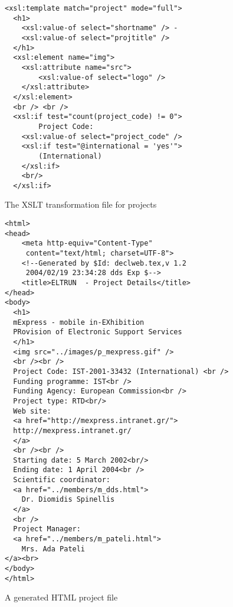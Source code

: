 \documentclass[10pt]{article}
\begin{document}
\begin{figure}
\lstset{language=PROJECTXSLT}
{\begin{lstlisting}
<xsl:template match="project" mode="full">
  <h1> 
  	<xsl:value-of select="shortname" /> -
	<xsl:value-of select="projtitle" /> 
  </h1>
  <xsl:element name="img">
  	<xsl:attribute name="src">
		<xsl:value-of select="logo" />
	</xsl:attribute>
  </xsl:element>
  <br /> <br />
  <xsl:if test="count(project_code) != 0">
    	Project Code: 
	<xsl:value-of select="project_code" />
	<xsl:if test="@international = 'yes'">
		(International)
	</xsl:if> 
	<br/>
  </xsl:if>
\end{lstlisting}}
\caption{The XSLT transformation file for projects}
\label{fig:project-xslt}
\end{figure}

\begin{figure}
\lstset{language=HTML}
{\begin{lstlisting}
<html>
<head>
	<meta http-equiv="Content-Type" 
	 content="text/html; charset=UTF-8">
	<!--Generated by $Id: declweb.tex,v 1.2 
	 2004/02/19 23:34:28 dds Exp $-->
	<title>ELTRUN  - Project Details</title>
</head>
<body>
  <h1>
  mExpress - mobile in-EXhibition 
  PRovision of Electronic Support Services
  </h1>
  <img src="../images/p_mexpress.gif" />
  <br /><br />
  Project Code: IST-2001-33432 (International) <br />
  Funding programme: IST<br />
  Funding Agency: European Commission<br />
  Project type: RTD<br/>
  Web site:
  <a href="http://mexpress.intranet.gr/">
  http://mexpress.intranet.gr/
  </a>
  <br /><br />
  Starting date: 5 March 2002<br/>
  Ending date: 1 April 2004<br />
  Scientific coordinator:
  <a href="../members/m_dds.html">
  	Dr. Diomidis Spinellis
  </a>
  <br />
  Project Manager:
  <a href="../members/m_pateli.html">
  	Mrs. Ada Pateli
</a><br>
</body>
</html>
\end{lstlisting}}
\caption{A generated HTML project file}
\label{fig:project-html}
\end{figure}
\end{document}
